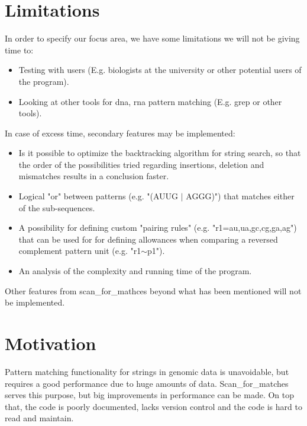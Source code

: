 \documentclass[12pt]{article}
\begin{document}
\section{Limitations}
In order to specify our focus area, we have some limitations we will not be giving time to:
\begin{itemize}
	\item Testing with users (E.g. biologists at the university or other potential users of the program).
	\item Looking at other tools for dna, rna pattern matching (E.g. grep or other tools).
\end{itemize}
\begin{flushleft}
In case of excess time, secondary features may be implemented: 
\end{flushleft}


\begin{itemize}
\item Is it possible to optimize the backtracking algorithm for string search, so that the order of the possibilities 
tried regarding insertions, deletion and mismatches results in a conclusion faster.
\item Logical "or" between patterns (e.g. "(AUUG $|$ AGGG)") that matches either of the sub-sequences.
\item A possibility for defining custom "pairing rules" (e.g. "r1={au,ua,gc,cg,ga,ag}") that can be used for 
for defining allowances when comparing a reversed complement pattern unit (e.g. "r1$\sim$p1").
\item An analysis of the complexity and running time of the program.
\end{itemize}
Other features from scan\_for\_mathces beyond what has been mentioned will not be implemented.


\section{Motivation}
Pattern matching functionality for strings in genomic data is unavoidable, 
but requires a good performance due to huge amounts of data. 
Scan\_for\_matches serves this purpose, but big improvements in performance can be made.
On top that, the code is poorly documented, lacks version control and the code is hard to read and maintain.
\end{document}
